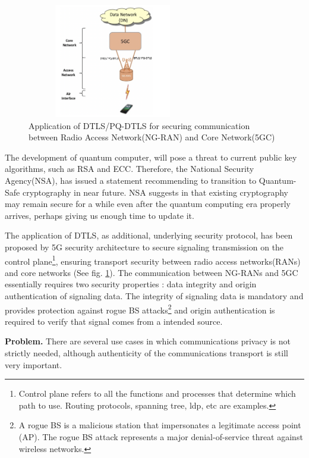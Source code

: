 \begin{figure}[H]
    \centering
    \includegraphics[height=5cm,width=7.5cm]{figures/5g-cn-ran.png}
    \caption{Application of DTLS/PQ-DTLS for securing communication between Radio Access Network(NG-RAN) and Core Network(5GC)}
    \label{5g-cn-ran}
\end{figure}


The development of quantum computer, will pose a threat to current public key algorithms, such as RSA and ECC. Therefore, the National Security Agency(NSA)\cite{NSA}, has issued a statement recommending to transition to Quantum-Safe cryptography in near future. NSA suggests in \cite{NSAonPQ} that existing cryptography may remain secure for a while even after the quantum computing era properly arrives, perhaps giving us enough time to update it.


The application of DTLS, as additional, underlying security protocol, has been proposed by 5G security architecture \cite{huawei5g} to secure signaling transmission on the control plane\footnote{Control plane refers to all the functions and processes that determine which path to use. Routing protocols, spanning tree, ldp, etc are examples.}, ensuring transport security between radio access networks(RANs) and core networks (See fig. \ref{5g-cn-ran}). The communication between NG-RANs and 5GC essentially requires two security properties : data integrity and origin authentication of signaling data. The integrity of signaling data is mandatory and provides protection against rogue BS attacks\footnote{A rogue BS is a malicious station that impersonates a legitimate access point  (AP).  The  rogue  BS  attack  represents  a  major  denial-of-service  threat  against  wireless  networks.}  and origin authentication is required to verify that signal comes from a intended source.\cite{boudriga2009security}

\textbf{Problem.}
There are several use cases in which communications privacy is not strictly needed, although authenticity of the communications transport is still very important.

